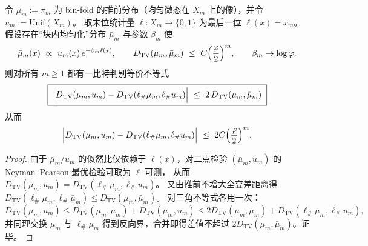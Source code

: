 \begin{theorem}\label{thm:window6-binfold-lastbit-lecam-equivalence}
令
\(
\mu_m:=\pi_m
\)
为 bin-fold 的推前分布（均匀微态在 \(X_m\) 上的像），并令 \(u_m:=\mathrm{Unif}(X_m)\)。
取末位统计量 \(\ell:X_m\to\{0,1\}\) 为最后一位 \(\ell(x)=x_m\)。
假设存在“块内均匀化”分布 \(\bar\mu_m\) 与参数 \(\beta_m\) 使
\[
\bar\mu_m(x)\ \propto\ u_m(x)\,e^{-\beta_m\ell(x)},
\qquad
D_{\mathrm{TV}}(\mu_m,\bar\mu_m)\ \le\ C\Bigl(\frac{\varphi}{2}\Bigr)^m,
\qquad
\beta_m\to\log\varphi.
\]
则对所有 \(m\ge 1\) 都有一比特判别等价不等式
\[
\boxed{\;
\Bigl|D_{\mathrm{TV}}(\mu_m,u_m)-D_{\mathrm{TV}}(\ell_\#\mu_m,\ell_\#u_m)\Bigr|
\ \le\ 2\,D_{\mathrm{TV}}(\mu_m,\bar\mu_m)\;}
\]
从而
\[
\Bigl|D_{\mathrm{TV}}(\mu_m,u_m)-D_{\mathrm{TV}}(\ell_\#\mu_m,\ell_\#u_m)\Bigr|
\ \le\ 2C\Bigl(\frac{\varphi}{2}\Bigr)^m.
\]
\end{theorem}
\begin{proof}
由于 \(\bar\mu_m/u_m\) 的似然比仅依赖于 \(\ell(x)\)，对二点检验 \((\bar\mu_m,u_m)\) 的 Neyman--Pearson 最优检验可取为 \(\ell\)-可测，
从而
\(D_{\mathrm{TV}}(\bar\mu_m,u_m)=D_{\mathrm{TV}}(\ell_\#\bar\mu_m,\ell_\#u_m)\)。
又由推前不增大全变差距离得
\(D_{\mathrm{TV}}(\ell_\#\mu_m,\ell_\#\bar\mu_m)\le D_{\mathrm{TV}}(\mu_m,\bar\mu_m)\)。
对三角不等式各用一次：
\[
D_{\mathrm{TV}}(\mu_m,u_m)
\le D_{\mathrm{TV}}(\mu_m,\bar\mu_m)+D_{\mathrm{TV}}(\bar\mu_m,u_m)
\le 2D_{\mathrm{TV}}(\mu_m,\bar\mu_m)+D_{\mathrm{TV}}(\ell_\#\mu_m,\ell_\#u_m),
\]
并同理交换 \(\mu_m\) 与 \(\ell_\#\mu_m\) 得到反向界，合并即得差值不超过 \(2D_{\mathrm{TV}}(\mu_m,\bar\mu_m)\)。证毕。
\end{proof}

